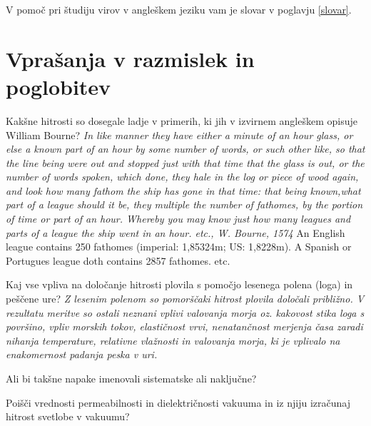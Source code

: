 \vspace{1cm}
V pomoč pri študiju virov v angleškem jeziku vam je slovar v poglavju \ref{slovar}. 


 


%
%
%
\section*{Vprašanja v razmislek in poglobitev}
%
\begin{prob}
\label{prob1}
Kakšne hitrosti so dosegale ladje v primerih, ki jih v izvirnem angleškem opisuje William Bourne? \textit{In like manner they have either a minute of an hour glass, or else a known part of an hour by some number of words, or such other like, so that the line being were out and stopped just with that time that the glass is out, or the number of words spoken, which done, they hale in the log or piece of wood again, and look how many fathom the ship has gone in that time: that being known,what part of a league should it be, they multiple the number of fathomes, by the portion of time or part of an hour. Whereby you may know just how many leagues and parts of a league the ship went in an hour. etc., W. Bourne, 1574} An English league contains 250 fathomes (imperial: 1,85324m; US: 1,8228m). A Spanish or Portugues league doth contains 2857 fathomes. etc.
\end{prob}

\begin{prob}
\label{prob2}
Kaj vse vpliva na določanje hitrosti plovila s pomočjo lesenega polena (loga) in peščene ure? \textit{Z lesenim polenom so pomorščaki hitrost plovila določali približno. V rezultatu meritve so ostali neznani vplivi valovanja morja oz. kakovost stika loga s površino, vpliv morskih tokov, elastičnost vrvi, nenatančnost merjenja časa zaradi nihanja temperature, relativne vlažnosti in valovanja morja, ki je vplivalo na enakomernost padanja peska v uri.} 

Ali bi takšne napake imenovali sistematske ali naključne?
\end{prob}

\begin{prob}
	\label{prob3}
	Poišči vrednosti permeabilnosti in dielektričnosti vakuuma in iz njiju izračunaj hitrost svetlobe v vakuumu? 
\end{prob}


%
